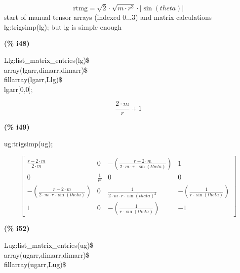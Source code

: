\documentclass[fleqn]{article}
\begin{document}
\[\tag{\% t44} 
\ensuremath{\mathrm{rtmg}}\mathop{=}\sqrt{2}\mathop{\ensuremath{\cdot}}\sqrt{m\mathop{\ensuremath{\cdot}}{{r}^{3}}}\mathop{\ensuremath{\cdot}}\left| \sin{(theta)}\right| \mbox{}
\]
start of manual tensor arrays (indexed 0...3) and matrix calculations
lg:trigsimp(lg); but lg is simple enough


\noindent
\begin{minipage}[t]{4.000000em}\color{red}\bfseries
(\% i48)	
\end{minipage}
\begin{minipage}[t]{\textwidth}\color{blue}
Llg:list\_matrix\_entries(lg)\$\\
array(lgarr,dimarr,dimarr)\$\\
fillarray(lgarr,Llg)\$\\
lgarr[0,0];
\end{minipage}
\[\displaystyle \tag{\% o48} 
\frac{2\mathop{\ensuremath{\cdot}}m}{r}\mathop{+}1\mbox{}
\]


\noindent
\begin{minipage}[t]{4.000000em}\color{red}\bfseries
(\% i49)	
\end{minipage}
\begin{minipage}[t]{\textwidth}\color{blue}
ug:trigsimp(ug);
\end{minipage}
\[\displaystyle \tag{\% o49} 
\begin{bmatrix}\frac{r\mathop{-}2\mathop{\ensuremath{\cdot}}m}{2\mathop{\ensuremath{\cdot}}m} & 0 & \mathop{-}\left( \frac{r\mathop{-}2\mathop{\ensuremath{\cdot}}m}{2\mathop{\ensuremath{\cdot}}m\mathop{\ensuremath{\cdot}}r\mathop{\ensuremath{\cdot}}\sin{(theta)}}\right)  & 1\\
0 & \frac{1}{{{r}^{2}}} & 0 & 0\\
\mathop{-}\left( \frac{r\mathop{-}2\mathop{\ensuremath{\cdot}}m}{2\mathop{\ensuremath{\cdot}}m\mathop{\ensuremath{\cdot}}r\mathop{\ensuremath{\cdot}}\sin{(theta)}}\right)  & 0 & \frac{1}{2\mathop{\ensuremath{\cdot}}m\mathop{\ensuremath{\cdot}}r\mathop{\ensuremath{\cdot}}{{\sin{(theta)}}^{2}}} & \mathop{-}\left( \frac{1}{r\mathop{\ensuremath{\cdot}}\sin{(theta)}}\right) \\
1 & 0 & \mathop{-}\left( \frac{1}{r\mathop{\ensuremath{\cdot}}\sin{(theta)}}\right)  & \mathop{-}1\end{bmatrix}\mbox{}
\]


\noindent
\begin{minipage}[t]{4.000000em}\color{red}\bfseries
(\% i52)	
\end{minipage}
\begin{minipage}[t]{\textwidth}\color{blue}
Lug:list\_matrix\_entries(ug)\$\\
array(ugarr,dimarr,dimarr)\$\\
fillarray(ugarr,Lug)\$
\end{minipage}
\end{document}
